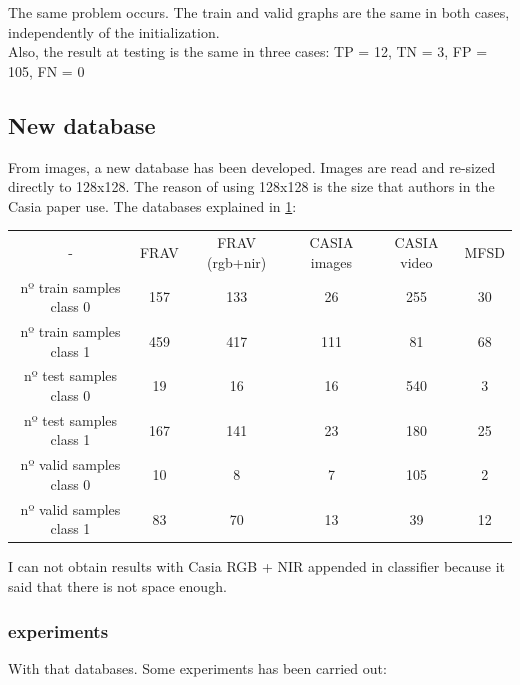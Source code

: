 The same problem occurs. The train and valid graphs are the same in both cases, independently of the initialization.\\ Also, the result at testing is the same in three cases: TP = 12, TN = 3, FP = 105, FN = 0\\


\clearpage

\subsection{New database}
From images, a new database has been developed. Images are read and re-sized directly to 128x128. The reason of using 128x128 is the size that authors in the Casia paper use.  The databases explained in \ref{tabla-databasesDistribution}:

\begin{table}[htb]
\centering
\begin{tabular}{cccccc}
-                         & FRAV & FRAV (rgb+nir) & CASIA images & CASIA video &  MFSD\\
nº train samples class 0  & 157  &   133    &     26       &  255    &    30\\
nº train samples class 1  & 459  &   417    &     111      &  81     &    68\\
nº test samples class 0   &  19  &   16    &       16      &  540    &     3\\
nº test samples class 1   & 167  &   141    &      23      &  180    &    25 \\
nº valid samples class 0  &  10  &   8     &        7      &  105    &     2\\
nº valid samples class 1  &  83  &   70    &       13      &  39     &    12\\

\end{tabular} \label{tabla-databasesDistribution}

\end{table}


I can not obtain results with Casia RGB + NIR appended in classifier because it said that there is not space enough.\\

\clearpage
\subsubsection{experiments}
With that databases. Some experiments has been carried out:

